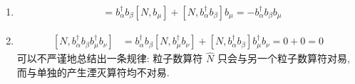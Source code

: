 \documentclass[../../main.tex]{subfiles}
\begin{document}
\begin{enumerate}
{{\begin{enumerate}
\begin{align*}
        )b_{i}
      \right\}\\
      &= \sum_{i}\left\{
        b_{i}^{\dagger}(b_{\alpha}^{\dagger}\cdot 0 + \delta_{i\alpha}b_{\beta}) + (b_{\alpha}^{\dagger}(-\delta_{i\beta}) + 0\cdot b_{\beta})b_{i}
      \right\}\\
      &= \sum_{i}\left(b_{i}^{\dagger}b_{\beta}\delta_{i\alpha} - b_{\alpha}^{\dagger}b_{i}\delta_{i\beta}\right) = 0.
    \end{align*}
    \item
    \begin{align*}
      [N,b_{\alpha}^{\dagger}b_{\beta}b_{\mu}] &= b_{\alpha}^{\dagger}b_{\beta}[N,b_{\mu}] + [N,b_{\alpha}^{\dagger}b_{\beta}]b_{\mu} = -b_{\alpha}^{\dagger}b_{\beta}b_{\mu}
    \end{align*}
    \item
    \begin{align*}
      \boxed{[N,b_{\alpha}^{\dagger}b_{\beta}b_{\mu}^{\dagger}b_{\nu}]} &= b_{\alpha}^{\dagger}b_{\beta}[N, b_{\mu}^{\dagger}b_{\nu}] + [N, b_{\alpha}^{\dagger}b_{\beta}]b_{\mu}^{\dagger}b_{\nu} = 0 + 0 = 0
    \end{align*}
    可以不严谨地总结出一条规律: 粒子数算符 $\hat{N}$ 只会与另一个粒子数算符对易, 而与单独的产生湮灭算符均不对易.
  \end{enumerate}}}
\end{enumerate}
\end{document}
